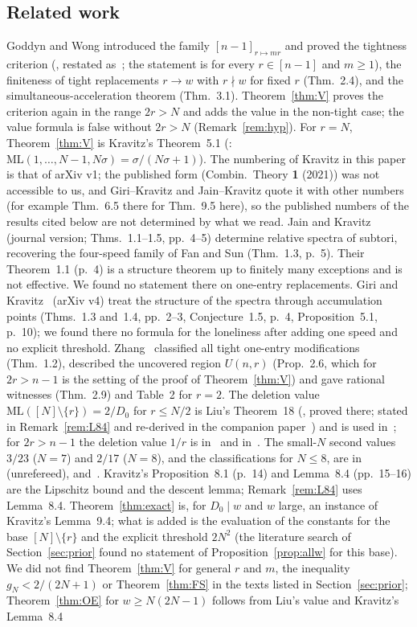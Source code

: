 \documentclass[11pt]{article}
\theoremstyle{definition}
\theoremstyle{remark}
\newcommand{\ML}{\mathrm{ML}}
\begin{document}
\subsection{Related work}
Goddyn and Wong introduced the family $[n-1]_{r\mapsto mr}$ and proved the tightness criterion (\cite[Thm.~2.3]{GW}, restated as~\cite[Thm.~1.1]{Z}; the statement is for every $r\in[n-1]$ and $m\ge1$), the finiteness of tight replacements $r\to w$ with $r\nmid w$ for fixed $r$ (Thm.~2.4), and the simultaneous-acceleration theorem (Thm.~3.1). Theorem~\ref{thm:V} proves the criterion again in the range $2r>N$ and adds the value in the non-tight case; the value formula is false without $2r>N$ (Remark~\ref{rem:hyp}). For $r=N$, Theorem~\ref{thm:V} is Kravitz's Theorem~5.1 (\cite[pp.~7--8]{K}: $\ML(1,\dots,N-1,N\sigma)=\sigma/(N\sigma+1)$). The numbering of Kravitz in this paper is that of arXiv v1; the published form (Combin.\ Theory \textbf{1} (2021)) was not accessible to us, and Giri--Kravitz and Jain--Kravitz quote it with other numbers (for example Thm.~6.5 there for Thm.~9.5 here), so the published numbers of the results cited below are not determined by what we read. Jain and Kravitz~\cite{JK} (journal version; Thms.~1.1--1.5, pp.~4--5) determine relative spectra of subtori, recovering the four-speed family of Fan and Sun (Thm.~1.3, p.~5). Their Theorem~1.1 (p.~4) is a structure theorem up to finitely many exceptions and is not effective. We found no statement there on one-entry replacements. Giri and Kravitz~\cite{GK} (arXiv v4) treat the structure of the spectra through accumulation points (Thms.~1.3 and~1.4, pp.~2--3, Conjecture~1.5, p.~4, Proposition~5.1, p.~10); we found there no formula for the loneliness after adding one speed and no explicit threshold. Zhang~\cite{Z} classified all tight one-entry modifications (Thm.~1.2), described the uncovered region $U(n,r)$ (Prop.~2.6, which for $2r>n-1$ is the setting of the proof of Theorem~\ref{thm:V}) and gave rational witnesses (Thm.~2.9) and Table~2 for $r=2$. The deletion value $\ML([N]\setminus\{r\})=2/D_0$ for $r\le N/2$ is Liu's Theorem~18 (\cite[p.~16, proof pp.~16--17]{L}, proved there; stated in Remark~\ref{rem:L84} and re-derived in the companion paper~\cite{A2}) and is used in~\cite[Thm.~2.9, 2.11]{Z}; for $2r>n-1$ the deletion value $1/r$ is in~\cite{R1337} and in~\cite[Thm.~2.1]{P}. The small-$N$ second values $3/23$ ($N=7$) and $2/17$ ($N=8$), and the classifications for $N\le8$, are in~\cite{R1337} (unrefereed), \cite{C} and~\cite[Section~1, Remark~6.2]{FS}. Kravitz's Proposition~8.1 (p.~14) and Lemma~8.4 (pp.~15--16) are the Lipschitz bound and the descent lemma; Remark~\ref{rem:L84} uses Lemma~8.4. Theorem~\ref{thm:exact} is, for $D_0\mid w$ and $w$ large, an instance of Kravitz's Lemma~9.4; what is added is the evaluation of the constants for the base $[N]\setminus\{r\}$ and the explicit threshold $2N^2$ (the literature search of Section~\ref{sec:prior} found no statement of Proposition~\ref{prop:allw} for this base). We did not find Theorem~\ref{thm:V} for general $r$ and $m$, the inequality $g_N<2/(2N+1)$ or Theorem~\ref{thm:FS} in the texts listed in Section~\ref{sec:prior}; Theorem~\ref{thm:OE} for $w\ge N(2N-1)$ follows from Liu's value and Kravitz's Lemma~8.4 
\end{document}
